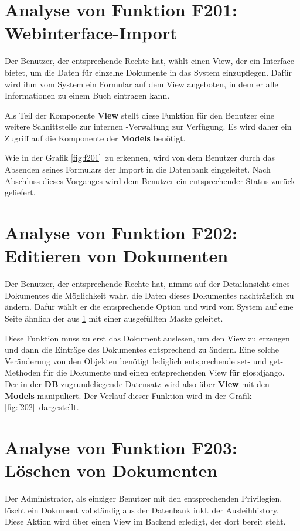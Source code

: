 \section{Analyse von Funktion F201: Webinterface-Import}
\label{f:201}
Der Benutzer, der entsprechende Rechte hat, wählt einen View, der ein Interface
bietet, um die Daten für einzelne Dokumente in das System einzupflegen. Dafür
wird ihm vom System ein Formular auf dem View angeboten, in dem er alle
Informationen zu einem Buch eintragen kann.

Als Teil der Komponente \textbf{View} stellt diese Funktion für den
Benutzer eine weitere Schnittstelle zur internen \BibTeX -Verwaltung zur Verfügung. Es wird
daher ein Zugriff auf die Komponente der \textbf{Models} benötigt.

Wie in der Grafik \ref{fig:f201}\ zu erkennen, wird von dem Benutzer durch das
Absenden seines Formulars der Import in die Datenbank eingeleitet. Nach
Abschluss dieses Vorganges wird dem Benutzer ein entsprechender Status zurück
geliefert.

\section{Analyse von Funktion F202: Editieren von Dokumenten}
Der Benutzer, der entsprechende Rechte hat, nimmt auf der Detailansicht eines
Dokumentes die Möglichkeit wahr, die Daten dieses Dokumentes nachträglich zu
ändern. Dafür wählt er die entsprechende Option und wird vom System auf eine
Seite ähnlich der aus \ref{f:201}  mit einer ausgefüllten Maske
geleitet.

Diese Funktion muss zu erst das Dokument auslesen, um den View zu erzeugen und
dann die Einträge des Dokumentes entsprechend zu ändern. Eine solche Veränderung
von den Objekten benötigt lediglich entsprechende set- und get-Methoden für die
Dokumente und einen entsprechenden View für \gls{glos:django}. Der in der
\textbf{DB} zugrundeliegende Datensatz wird also über \textbf{View} mit
den \textbf{Models} manipuliert. Der Verlauf dieser Funktion wird in der Grafik
\ref{fig:f202}\ dargestellt.


\section{Analyse von Funktion F203: Löschen von Dokumenten}
Der Administrator, als einziger Benutzer mit den entsprechenden Privilegien,
löscht ein Dokument vollständig aus der Datenbank inkl. der Ausleihhistory.
Diese Aktion wird über einen View im Backend erledigt, der dort bereit steht.

